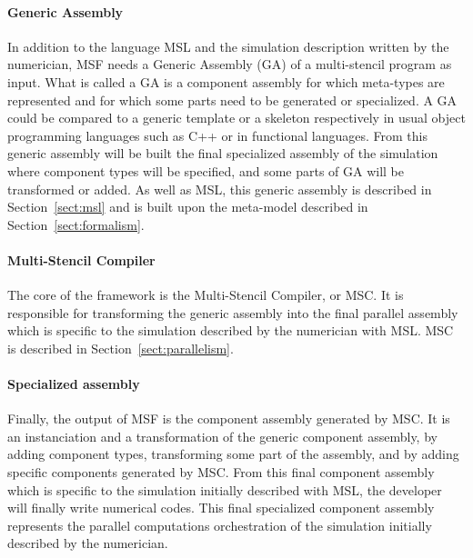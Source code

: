 \paragraph{\textbf{Generic Assembly}}
In addition to the language MSL and the simulation description written by the numerician, MSF needs a Generic Assembly (GA) of a multi-stencil program as input. What is called a GA is a component assembly for which meta-types are represented and for which some parts need to be generated or specialized. A GA could be compared to a generic template or a skeleton respectively in usual object programming languages such as C++ or in functional languages. From this generic assembly will be built the final specialized assembly of the simulation where component types will be specified, and some parts of GA will be transformed or added. As well as MSL, this generic assembly is described in Section~\ref{sect:msl} and is built upon the meta-model described in Section~\ref{sect:formalism}.

\paragraph{\textbf{Multi-Stencil Compiler}}
The core of the framework is the Multi-Stencil Compiler, or MSC. It is responsible for transforming the generic assembly into the final parallel assembly which is specific to the simulation described by the numerician with MSL. MSC is described in Section~\ref{sect:parallelism}.

\paragraph{\textbf{Specialized assembly}}
Finally, the output of MSF is the component assembly generated by MSC. It is an instanciation and a transformation of the generic component assembly, by adding component types, transforming some part of the assembly, and by adding specific components generated by MSC. From this final component assembly which is specific to the simulation initially described with MSL, the developer will finally write numerical codes. This final specialized component assembly represents the parallel computations orchestration of the simulation initially described by the numerician.
